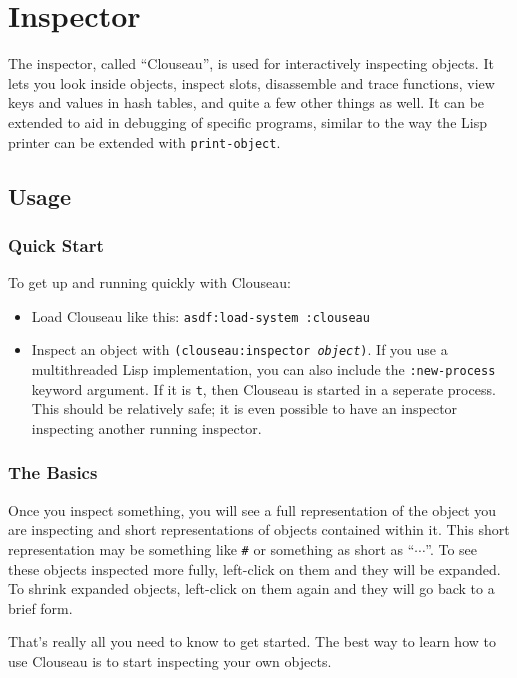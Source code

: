 \chapter{Inspector}

The inspector, called ``Clouseau'', is used for interactively inspecting
objects. It lets you look inside objects, inspect slots, disassemble and
trace functions, view keys and values in hash tables, and quite a few
other things as well. It can be extended to aid in debugging of specific
programs, similar to the way the Lisp printer can be extended with
\texttt{print-object}.

\section{Usage}

\subsection{Quick Start}

To get up and running quickly with Clouseau:

\begin{itemize}
\item Load Clouseau like this: \texttt{asdf:load-system :clouseau}
\item
  Inspect an object with \texttt{(clouseau:inspector
    \textit{object})}. If you use a multithreaded Lisp implementation,
  you can also include the \texttt{:new-process} keyword argument. If it
  is \texttt{t}, then Clouseau is started in a seperate process. This
  should be relatively safe; it is even possible to have an inspector
  inspecting another running inspector.
\end{itemize}

\subsection{The Basics}

Once you inspect something, you will see a full representation of the
object you are inspecting and short representations of objects contained
within it. This short representation may be something like
\texttt{\#<STANDARD-CLASS SALAD-MIXIN>} or something as short as ``$\cdots$''.
To see these objects inspected more fully, left-click on them and they
will be expanded. To shrink expanded objects, left-click on them again
and they will go back to a brief form.

That's really all you need to know to get started. The best way to learn
how to use Clouseau is to start inspecting your own objects.

